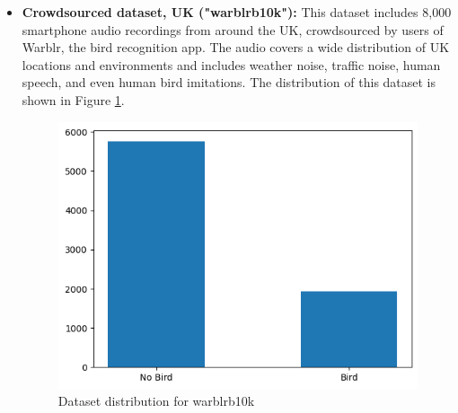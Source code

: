 \begin{itemize}
            \item \textbf{Crowdsourced dataset, UK ("warblrb10k"):} This dataset includes 8,000 smartphone audio recordings from around the UK, crowdsourced by users of Warblr, the bird recognition app. The audio covers a wide distribution of UK locations and environments and includes weather noise, traffic noise, human speech, and even human bird imitations. The distribution of this dataset is shown in Figure \ref{fig:warblrb10k dataset}.
            \begin{figure}[h!]
                  \centering
                  \includegraphics[scale=0.75]{images/dataset_detection-2.png}
                  \caption{Dataset distribution for warblrb10k}
                  \label{fig:warblrb10k dataset}
            \end{figure}
      \end{itemize}


